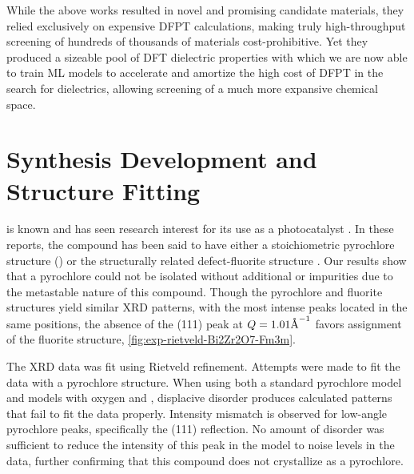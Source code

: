 \documentclass{article}
\newcommand{\BiZrO}[1][]{\ch{Bi2Zr2O7#1}}
\newcommand{\A}{\protect\text{Å}} %
\begin{document}
While the above works resulted in novel and promising candidate materials, they relied exclusively on expensive DFPT calculations, making truly high-throughput screening of hundreds of thousands of materials cost-prohibitive.
Yet they produced a sizeable pool of DFT dielectric properties with which we are now able to train ML models to accelerate and amortize the high cost of DFPT in the search for dielectrics, allowing screening of a much more expansive chemical space.

\section{\texorpdfstring{\BiZrO{}}{Bi2Zr2O7} Synthesis Development and Structure Fitting}
\label{sec:Bi2Zr2O7-synthesis-development}

\BiZrO{} is known and has seen research interest for its use as a photocatalyst \cite{wu_preparation_2015,jayaraman_bridging_2020,luo_new_2018}.
In these reports, the compound has been said to have either a stoichiometric pyrochlore structure () \cite{pandey_metastable_2018,luo_new_2018,liu_bi2zr2o7_2018,luo_synthesis_2019,jayaraman_bridging_2020,kurlla_greenengineered_2023} or the structurally related defect-fluorite structure \cite{sorokina_new_1998,sharma_synthesis_2013,wu_preparation_2015,rajashekharaiah_nuv_2019,feng_unraveling_2021,}.
Our results show that a pyrochlore could not be isolated without additional  or  impurities due to the metastable nature of this compound.
Though the pyrochlore and fluorite structures yield similar XRD patterns, with the most intense peaks located in the same positions, the absence of the (111) peak at $Q = 1.01\A^{-1}$ favors assignment of the fluorite structure, \cref{fig:exp-rietveld-Bi2Zr2O7-Fm3m}.

The XRD data was fit using Rietveld refinement.
Attempts were made to fit the data with a pyrochlore structure.
When using both a standard pyrochlore model and models with oxygen and , displacive disorder produces calculated patterns that fail to fit the data properly.
Intensity mismatch is observed for low-angle pyrochlore peaks, specifically the (111) reflection.
No amount of disorder was sufficient to reduce the intensity of this peak in the model to noise levels in the data, further confirming that this compound does not crystallize as a pyrochlore.
\end{document}
